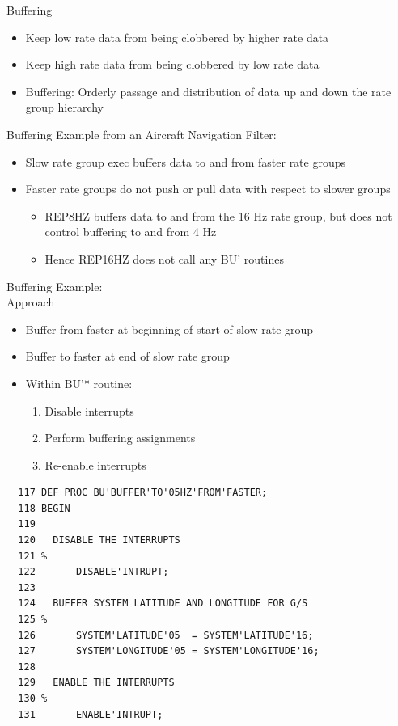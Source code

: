 \begin{frame}
Buffering
 \begin{itemize}
 \item Keep low rate data from being clobbered by higher rate data
 \item Keep high rate data from being clobbered by low rate data
 \item Buffering: Orderly passage and distribution of data up and down the rate group hierarchy
\end{itemize}
\end{frame}

\begin{frame}
Buffering Example from an Aircraft Navigation Filter:
\begin{itemize}
  \item Slow rate group exec buffers data to and from faster rate groups
  \item Faster rate groups do not push or pull data with respect to slower groups
	\begin{itemize}
		\item REP8HZ buffers data to and from the 16 Hz 
rate group, but does not control buffering to and from 4 Hz
		\item Hence REP16HZ does not call any BU' routines
	\end{itemize}
\end{itemize} 
\end{frame}

\begin{frame}
Buffering Example:\\
Approach
\begin{itemize}
  \item Buffer from faster at beginning of start of slow rate group
  \item Buffer to faster at end of slow rate group
  \item Within BU'* routine:
	\begin{enumerate}
		\item Disable interrupts
		\item Perform buffering assignments
		\item Re-enable interrupts
	\end{enumerate}
\end{itemize} 
\end{frame}
\begin{frame}[fragile]
\begin{verbatim}
  117 DEF PROC BU'BUFFER'TO'05HZ'FROM'FASTER;
  118 BEGIN
  119 
  120   DISABLE THE INTERRUPTS
  121 %
  122       DISABLE'INTRUPT;
  123 
  124   BUFFER SYSTEM LATITUDE AND LONGITUDE FOR G/S
  125 %
  126       SYSTEM'LATITUDE'05  = SYSTEM'LATITUDE'16;
  127       SYSTEM'LONGITUDE'05 = SYSTEM'LONGITUDE'16;
  128 
  129   ENABLE THE INTERRUPTS
  130 %
  131       ENABLE'INTRUPT;
\end{verbatim}
\end{frame}
